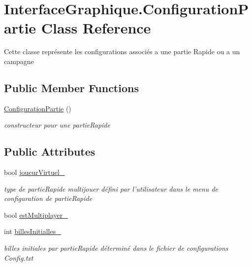\hypertarget{class_interface_graphique_1_1_configuration_partie}{\section{Interface\-Graphique.\-Configuration\-Partie Class Reference}
\label{class_interface_graphique_1_1_configuration_partie}
}


Cette classe représente les configurations associés a une partie Rapide ou a un campagne  


\subsection*{Public Member Functions}
\begin{DoxyCompactItemize}
\item 
\hyperlink{class_interface_graphique_1_1_configuration_partie_ad76acf6af1265023c8184da2825994e9}{Configuration\-Partie} ()
\begin{DoxyCompactList}\small\item\em constructeur pour une partie\-Rapide \end{DoxyCompactList}\end{DoxyCompactItemize}
\subsection*{Public Attributes}
\begin{DoxyCompactItemize}
\item 
bool \hyperlink{class_interface_graphique_1_1_configuration_partie_a166c6a679593d7f6ceb8d6ed4a7a3eff}{joueur\-Virtuel\-\_\-}
\begin{DoxyCompactList}\small\item\em type de partie\-Rapide multijouer défini par l'utilisateur dans le menu de configuration de partie\-Rapide \end{DoxyCompactList}\item 
bool \hyperlink{class_interface_graphique_1_1_configuration_partie_a039f0afcee48e4f3ccfe5f4211a6e6a6}{est\-Multiplayer\-\_\-}
\item 
int \hyperlink{class_interface_graphique_1_1_configuration_partie_afdda795c3afe6be9b08d78fa5cc67077}{billes\-Initialles\-\_\-}
\begin{DoxyCompactList}\small\item\em billes initiales par partie\-Rapide déterminé dans le fichier de configurations Config.\-txt \end{DoxyCompactList}\end{DoxyCompactItemize}


